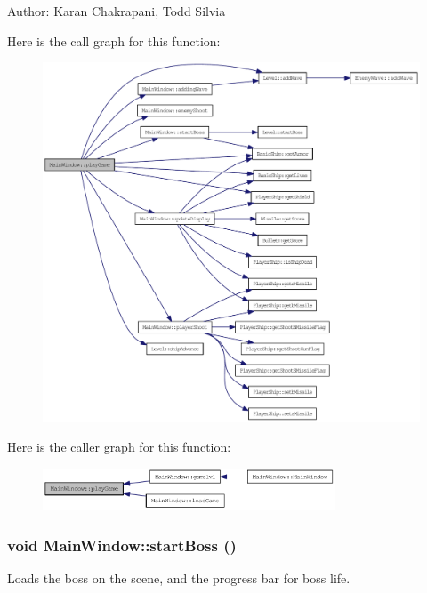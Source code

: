 Author: Karan Chakrapani, Todd Silvia 

Here is the call graph for this function:\nopagebreak
\begin{figure}[H]
\begin{center}
\leavevmode
\includegraphics[width=349pt]{class_main_window_a400071005bde6fee0623aafdb071ba89_cgraph}
\end{center}
\end{figure}


Here is the caller graph for this function:\nopagebreak
\begin{figure}[H]
\begin{center}
\leavevmode
\includegraphics[width=247pt]{class_main_window_a400071005bde6fee0623aafdb071ba89_icgraph}
\end{center}
\end{figure}
\hypertarget{class_main_window_addd77660e768b2eedb30c34815e9f1ab}{
\subsubsection[{startBoss}]{\setlength{\rightskip}{0pt plus 5cm}void MainWindow::startBoss ()}}
\label{class_main_window_addd77660e768b2eedb30c34815e9f1ab}
Loads the boss on the scene, and the progress bar for boss life.

